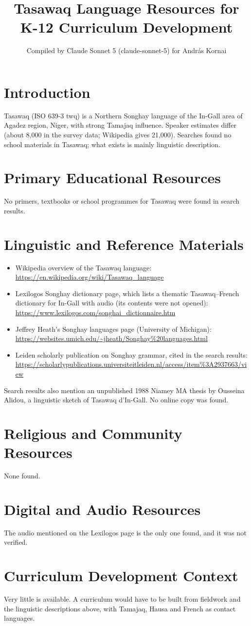 \documentclass[12pt]{article}
\title{Tasawaq Language Resources for K-12 Curriculum Development}
\author{Compiled by Claude Sonnet 5 (claude-sonnet-5) for Andr\'as Kornai}
\date{}
\begin{document}
\maketitle
\section{Introduction}
Tasawaq (ISO 639-3 twq) is a Northern Songhay language of the In-Gall area of Agadez region, Niger, with strong Tamajaq influence. Speaker estimates differ (about 8,000 in the survey data; Wikipedia gives 21,000). Searches found no school materials in Tasawaq; what exists is mainly linguistic description.
\section{Primary Educational Resources}
No primers, textbooks or school programmes for Tasawaq were found in search results.
\section{Linguistic and Reference Materials}
\begin{itemize}
\item Wikipedia overview of the Tasawaq language: \url{https://en.wikipedia.org/wiki/Tasawaq_language}
\item Lexilogos Songhay dictionary page, which lists a thematic Tasawaq--French dictionary for In-Gall with audio (its contents were not opened): \url{https://www.lexilogos.com/songhai_dictionnaire.htm}
\item Jeffrey Heath's Songhay languages page (University of Michigan): \url{https://websites.umich.edu/~jheath/Songhay%20languages.html}
\item Leiden scholarly publication on Songhay grammar, cited in the search results: \url{https://scholarlypublications.universiteitleiden.nl/access/item%3A2937663/view}
\end{itemize}
Search results also mention an unpublished 1988 Niamey MA thesis by Ousseina Alidou, a linguistic sketch of Tasawaq d'In-Gall. No online copy was found.
\section{Religious and Community Resources}
None found.
\section{Digital and Audio Resources}
The audio mentioned on the Lexilogos page is the only one found, and it was not verified.
\section{Curriculum Development Context}
Very little is available. A curriculum would have to be built from fieldwork and the linguistic descriptions above, with Tamajaq, Hausa and French as contact languages.
\end{document}
